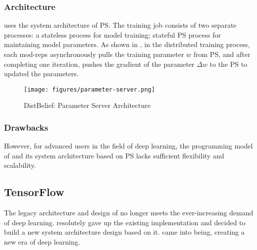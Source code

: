 \begin{content}
\subsubsection{Architecture}
 uses the system architecture of \gls{PS}. The training job consists of two separate processes: a stateless  process for model training; stateful \gls{PS} process for maintaining model parameters. As shown in , in the distributed training process, each \glspl{mod-rep} asynchronously pulls the training parameter $w$ from \gls{PS}, and after completing one iteration, pushes the gradient of the parameter $ \Delta w $ to the \gls{PS} to updated the parameters.
\begin{figure}[H]
  \centering
  \texttt{[image: figures/parameter-server.png]}
  \caption{DistBelief: Parameter Server Architecture}
  \label{fig:parameter-server}
\end{figure}


\subsubsection{Drawbacks}
However, for advanced users in the field of deep learning, the programming model of  and its system architecture based on \gls{PS} lacks sufficient flexibility and scalability.
\begin{enum}
\end{enum}


\subsection{TensorFlow}
The legacy architecture and design of   no longer meets the ever-increasing demand of deep learning.  resolutely gave up the existing  implementation and decided to build a new system architecture design based on it.  came into being, creating a new era of deep learning.



\end{content}
